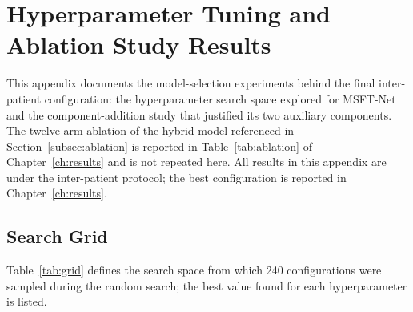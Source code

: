 %
%

\appendix
\clearpage
{}
{}


\chapter{Hyperparameter Tuning and Ablation Study Results}
\label{app:hyperparameter}

This appendix documents the model-selection experiments behind the final
inter-patient configuration: the hyperparameter search space explored for
MSFT-Net and the component-addition study that justified its two auxiliary
components. The twelve-arm ablation of the hybrid model referenced in
Section~\ref{subsec:ablation} is reported in Table~\ref{tab:ablation} of
Chapter~\ref{ch:results} and is not repeated here. All results in this
appendix are under the inter-patient protocol; the best configuration is
reported in Chapter~\ref{ch:results}.


\section{Search Grid}
\label{app:search_grid}

Table~\ref{tab:grid} defines the search space from which 240 configurations
were sampled during the random search; the best value found for each
hyperparameter is listed.

